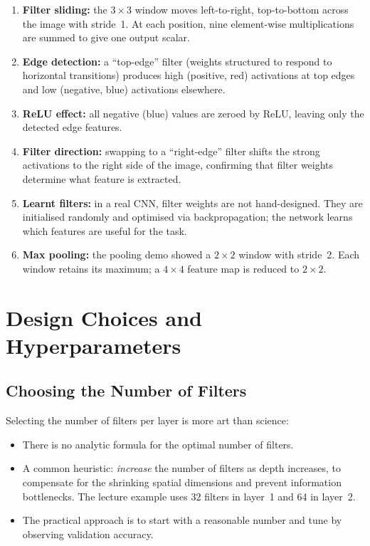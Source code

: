 \documentclass[12pt,a4paper]{article}
\begin{document}
\begin{enumerate}[label=\arabic*.]
  \item \textbf{Filter sliding:} the $3\times3$ window moves left-to-right,
        top-to-bottom across the image with stride~1.  At each position, nine
        element-wise multiplications are summed to give one output scalar.
  \item \textbf{Edge detection:} a ``top-edge'' filter (weights structured to
        respond to horizontal transitions) produces high (positive, red)
        activations at top edges and low (negative, blue) activations
        elsewhere.
  \item \textbf{ReLU effect:} all negative (blue) values are zeroed by ReLU,
        leaving only the detected edge features.
  \item \textbf{Filter direction:} swapping to a ``right-edge'' filter
        shifts the strong activations to the right side of the image,
        confirming that filter weights determine what feature is extracted.
  \item \textbf{Learnt filters:} in a real CNN, filter weights are not
        hand-designed.  They are initialised randomly and optimised via
        backpropagation; the network learns which features are useful for
        the task.
  \item \textbf{Max pooling:} the pooling demo showed a $2\times2$ window
        with stride~2.  Each window retains its maximum; a $4\times4$ feature
        map is reduced to $2\times2$.
\end{enumerate}

\section{Design Choices and Hyperparameters}
\label{sec:design}

\subsection{Choosing the Number of Filters}
\label{subsec:num_filters}

Selecting the number of filters per layer is more art than science:

\begin{itemize}[leftmargin=2em]
  \item There is no analytic formula for the optimal number of filters.
  \item A common heuristic: \emph{increase} the number of filters as depth
        increases, to compensate for the shrinking spatial dimensions and
        prevent information bottlenecks.  The lecture example uses 32 filters
        in layer~1 and 64 in layer~2.
  \item The practical approach is to start with a reasonable number and tune
        by observing validation accuracy.
\end{itemize}
\end{document}
